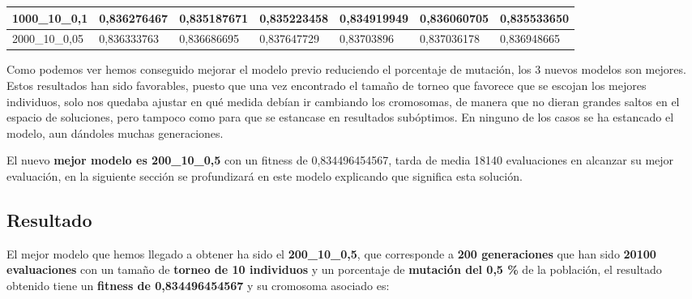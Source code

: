 \documentclass[12pt, spanish, pdftex]{UC3M_document}
\begin{document}
\begin{table}[H]
{\begin{tabular}{|l|l|l|l|l|l|l|}
			1000\_10\_0,1                                                                        & \cellcolor[HTML]{F8696B}0,836276467                                            & \cellcolor[HTML]{ECE582}0,835187671                                            & \cellcolor[HTML]{FFEB84}0,835223458                                            & \cellcolor[HTML]{63BE7B}0,834919949                                            & \cellcolor[HTML]{FA8471}0,836060705                                            & \cellcolor[HTML]{A5D17E}0,835533650                                                \\ \hline
			2000\_10\_0,05                                                                       & \cellcolor[HTML]{63BE7B}0,836333763                                            & \cellcolor[HTML]{B1D47F}0,836686695                                            & \cellcolor[HTML]{F8696B}0,837647729                                            & \cellcolor[HTML]{FFEB84}0,83703896                                             & \cellcolor[HTML]{FFEB84}0,837036178                                            & \cellcolor[HTML]{FDC67D}0,836948665                                                \\ \hline
		\end{tabular}%
	}
\end{table}

Como podemos ver hemos conseguido mejorar el modelo previo reduciendo el porcentaje de mutación, los 3 nuevos modelos son mejores. Estos resultados han sido favorables, puesto que una vez encontrado el tamaño de torneo que favorece que se escojan los mejores individuos, solo nos quedaba ajustar en qué medida debían ir cambiando los cromosomas, de manera que no dieran grandes saltos en el espacio de soluciones, pero tampoco como para que se estancase en resultados subóptimos. En ninguno de los casos se ha estancado el modelo, aun dándoles muchas generaciones.

El nuevo \textbf{mejor modelo es 200\_10\_0,5} con un fitness de 0,834496454567, tarda de media 18140 evaluaciones en alcanzar su mejor evaluación, en la siguiente sección se profundizará en este modelo explicando que significa esta solución.
\pagebreak

\subsection{Resultado}
El mejor modelo que hemos llegado a obtener ha sido el \textbf{200\_10\_0,5}, que corresponde a \textbf{200 generaciones} que han sido \textbf{20100 evaluaciones} con un tamaño de \textbf{torneo de 10 individuos} y un porcentaje de \textbf{mutación del 0,5 \%} de la población, el resultado obtenido tiene un \textbf{fitness de 0,834496454567} y su cromosoma asociado es:
\end{document}
